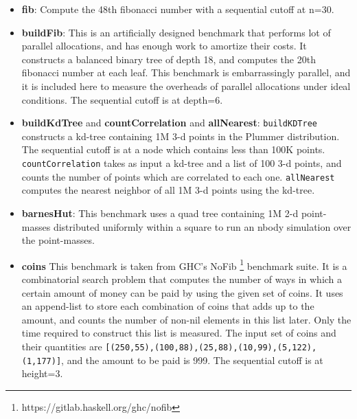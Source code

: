 \documentclass[showabstract,showacknowledgments,showpreface,showdedication,school]{iuphd}
\theoremstyle{nonumberplain}
\newcommand{\il}[1]{\lstinline[style=inline,mathescape=true];#1;}
\begin{document}
\begin{itemize}

\item \textbf{fib}:
  Compute the 48th fibonacci number with a sequential cutoff at n=30.

\item \textbf{buildFib}:
  This is an artificially designed benchmark that performs lot of parallel
  allocations, and has enough work to amortize their costs.
  It constructs a balanced binary tree of depth 18, and computes
  the 20th fibonacci number at each leaf.
  This benchmark is embarrassingly parallel, and it is included here to
  measure the overheads of parallel allocations under ideal conditions.
  The sequential cutoff is at depth=6.


\item \textbf{buildKdTree} and \textbf{countCorrelation} and \textbf{allNearest}:
  \il{buildKDTree} constructs a kd-tree \cite{kdtree}
  containing 1M 3-d points
  in the Plummer distribution.
  The sequential cutoff is at a node which contains less than 100K points.
  \il{countCorrelation} takes as input a kd-tree and a list of 100 3-d points,
  and counts the number of points which are correlated to each one.
  \il{allNearest} computes the nearest neighbor of all 1M 3-d points using the kd-tree.



\item \textbf{barnesHut}:
  This benchmark uses a quad tree
  containing 1M 2-d point-masses distributed uniformly within a square
  to run an nbody simulation over the point-masses.

\item \textbf{coins}
  This benchmark is taken from GHC's NoFib \footnote{https://gitlab.haskell.org/ghc/nofib}
  benchmark suite. It is a combinatorial search problem that computes
  the number of ways in which a certain amount of money can be paid by
  using the given set of coins. It uses an append-list to store each combination
  of coins that adds up to the amount, and counts the number of non-nil elements
  in this list later. Only the time required to construct this list is measured.
  The input set of coins and their quantities are
  \il{[(250,55),(100,88),(25,88),(10,99),(5,122),(1,177)]},
  and the amount to be paid is 999.
  The sequential cutoff is at height=3.


\end{itemize}
\end{document}
